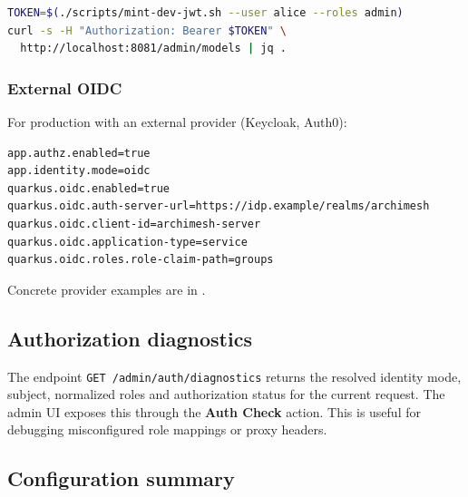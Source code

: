 \begin{lstlisting}[language=bash,caption={Bearer token usage}]
TOKEN=$(./scripts/mint-dev-jwt.sh --user alice --roles admin)
curl -s -H "Authorization: Bearer $TOKEN" \
  http://localhost:8081/admin/models | jq .
\end{lstlisting}

\subsubsection{External OIDC}

For production with an external provider (Keycloak, Auth0):

\begin{lstlisting}[caption={External OIDC config}]
app.authz.enabled=true
app.identity.mode=oidc
quarkus.oidc.enabled=true
quarkus.oidc.auth-server-url=https://idp.example/realms/archimesh
quarkus.oidc.client-id=archimesh-server
quarkus.oidc.application-type=service
quarkus.oidc.roles.role-claim-path=groups
\end{lstlisting}

Concrete provider examples are in .

\subsection{Authorization diagnostics}

The endpoint \texttt{GET /admin/auth/diagnostics} returns the resolved
identity mode, subject, normalized roles and authorization status for the
current request. The admin UI exposes this through the \textbf{Auth Check}
action. This is useful for debugging misconfigured role mappings or proxy
headers.

\subsection{Configuration summary}


